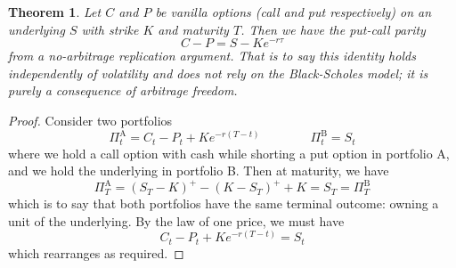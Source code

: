 \documentclass[12pt]{article}
\newtheorem{theorem}{Theorem}
\theoremstyle{definition}
\theoremstyle{remark}
\begin{document}
\begin{theorem}
	Let $C$ and $P$ be vanilla options (call and put respectively) on an underlying $S$ with strike $K$ and maturity $T$. Then we have the {\emph{put-call parity}}
	$$
	C - P = S - Ke^{-r\tau}
	$$
	from a no-arbitrage replication argument. That is to say this identity holds independently of volatility and does not rely on the Black-Scholes model; it is purely a consequence of arbitrage freedom.
\end{theorem}
\begin{proof}
	Consider two portfolios
	$$
	\Pi_t^\mathrm{A} = C_t - P_t + Ke^{-r(T-t)}
	\qquad\qquad
	\Pi_t^\mathrm{B} = S_t
	$$
	where we hold a call option with cash while shorting a put option in portfolio A, and we hold the underlying in portfolio B. Then at maturity, we have
	$$
	\Pi_T^\mathrm{A} = (S_T-K)^+ - (K-S_T)^+ + K = S_T = \Pi_T^\mathrm{B}
	$$
	which is to say that both portfolios have the same terminal outcome: owning a unit of the underlying. By the law of one price, we must have
	$$
	C_t - P_t + Ke^{-r(T-t)} = S_t
	$$
	which rearranges as required.
\end{proof}
\end{document}
